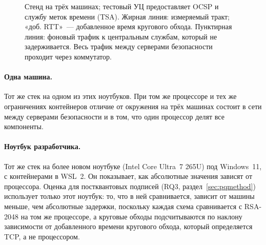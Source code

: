 \documentclass[conference,a4paper]{IEEEtran}
\newcommand{\newtext}[1]{{\color{blue}#1}}
\begin{document}
\begin{figure}[t]
\centering
{}
\caption{Стенд на трёх машинах; тестовый УЦ предоставляет OCSP и службу меток времени (TSA). Жирная линия: измеряемый тракт; «доб. RTT»~--- добавленное время кругового обхода. Пунктирная линия: фоновый
трафик к центральным службам, который не задерживается. Весь трафик между серверами безопасности
проходит через коммутатор.}
\label{fig:testbed}
\end{figure}

\paragraph{Одна машина.} Тот же стек на одном из этих ноутбуков. При том же процессоре и
тех же ограничениях контейнеров отличие от окружения на трёх машинах состоит в сети между
серверами безопасности и в том, что один процессор делят все компоненты.

\paragraph{Ноутбук разработчика.} Тот же стек на более новом ноутбуке (Intel Core Ultra~7 265U) под
Windows~11, с контейнерами в WSL~2. Он показывает, как абсолютные значения зависят от процессора\newtext{.
Оценка для постквантовых подписей (RQ3, раздел~\ref{sec:pqmethod}) использует только этот ноутбук:
то, что в ней сравнивается, зависит от машины меньше, чем абсолютные задержки, поскольку каждая схема
сравнивается с RSA-2048 на том же процессоре, а круговые обходы подсчитываются по наклону зависимости от
добавленного времени кругового обхода, который определяется TCP, а не процессором}.
\end{document}
